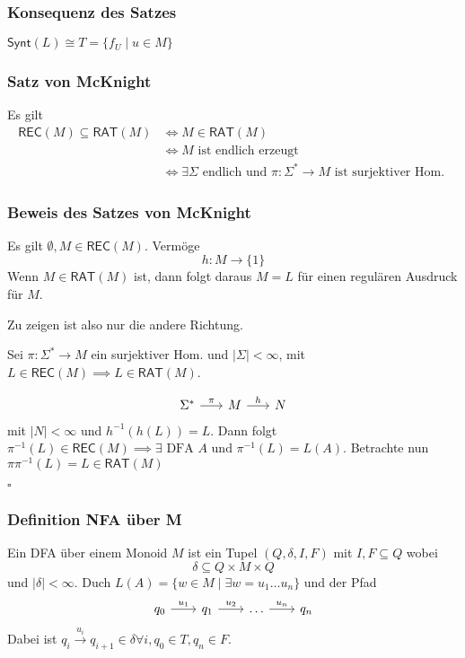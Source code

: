 \documentclass[12pt, german]{article}
\newcommand{\sigstern}{\Sigma^\ast}
\newcommand{\inv}{^{-1}}
\newcommand{\rat}{\mathsf{RAT}}
\newcommand{\rec}{\mathsf{REC}}
\newcommand{\synt}{\mathsf{Synt}}
\newcommand{\bewiesen}{
	
	\begin{flushright}
		$\square$  \\
\end{flushright}}
\begin{document}
	\subsubsection{Konsequenz des Satzes}
	$\synt(L) \cong T = \{f_U \mid u \in M\}$
	
	\subsubsection{Satz von McKnight}
	Es gilt 
	\begin{align*}
		\rec(M) \subseteq \rat(M) &\iff M \in \rat(M)\\ 
		&\iff M \text{ ist endlich erzeugt} \\ 
		&\iff \exists \Sigma \text{ endlich und } \pi : \sigstern \to M \text{ ist surjektiver Hom. }
	\end{align*}
	
	\subsubsection{Beweis des Satzes von McKnight}
	Es gilt $\emptyset, M \in \rec(M)$. Vermöge $$h: M \to \{1\}$$ Wenn $M \in \rat(M)$ ist, dann folgt daraus $M=L$ für einen regulären Ausdruck für $M$. 
	
	Zu zeigen ist also nur die andere Richtung. 
	\newline
	
	Sei $\pi : \sigstern \to M$ ein surjektiver Hom. und $|\Sigma| < \infty$, mit $L \in \rec(M) \implies L \in \rat(M)$. 
	
	\begin{equation*}
		\begin{tikzcd}[column sep=1.5pc]
			\sigstern \arrow{r}{\pi} & M \arrow{r}{h} & N 
		\end{tikzcd}
	\end{equation*}
	mit $|N| < \infty$ und $h\inv(h(L)) = L$. Dann folgt $\pi\inv(L) \in \rec(M) \implies \exists \text{ DFA } A \text{ und } \pi\inv(L) = L(A)$. Betrachte nun $\pi\pi\inv(L) = L \in \rat(M)$
	\bewiesen
	
	\subsubsection{Definition NFA über M}
	Ein DFA über einem Monoid $M$ ist ein Tupel $(Q, \delta, I, F)$ mit $I, F \subseteq Q$ wobei $$\delta \subseteq Q \times M \times Q$$ und $|\delta| < \infty$. 
	Duch $L(A) = \{w \in M \mid \exists w = u_1 \ldots u_n\}$ und der Pfad 
	\begin{equation*}
		\begin{tikzcd}[column sep=1.7pc]
			q_0\arrow{r}{u_1} &  q_1 \arrow{r}{u_2} & \ldots \arrow{r}{u_n} & q_n
		\end{tikzcd}
	\end{equation*}
	Dabei ist $q_i \overset{u_i}{\longrightarrow } q_{i+1} \in \delta \forall i, q_0 \in T, q_n \in F$.
	
\end{document}
